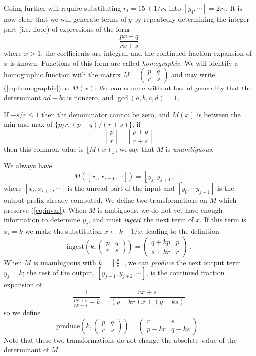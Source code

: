 \documentclass[11pt, oneside]{amsart}   	%
\newcommand{\pqrs}{\left(
\begin{smallmatrix} 
p & q\\ 
r & s 
\end{smallmatrix}
\right)}
\newcommand{\homographic}[4]{\begin{pmatrix} #1 & #2\\ #3 & #4 \end{pmatrix}}
\renewcommand{\:}{\negthickspace:\negthickspace}
\begin{document}
Going further will require substituting $r_1 = 15+1/r_2$ into $[y_4,\cdots] = 2r_1$.
It is now clear that we will generate terms of $y$ by repeatedly determining the integer part (i.e. floor) of expressions of the form
\begin{equation}\label{eq:homographic}
\frac{px+q}{rx+s}
\end{equation}
where $x > 1$, the coefficients are integral, and the continued fraction expansion of $x$ is known. Functions of this form are called \emph{homographic}.
We will identify a homographic function with the matrix
$M=\left(
\begin{smallmatrix} 
p & q\\ 
r & s 
\end{smallmatrix}
\right)$
and may write (\ref{eq:homographic}) as $M(x)$. We can assume without loss of generality that the determinant $ad-bc$ is nonzero, and $\gcd(a,b,c,d)=1$.

If $-s/r \leq 1$ then the denominator cannot be zero, and $M(x)$ is between the min and max of $\{p/r, (p+q)/(r+s)\}$; if
\[
\left\lfloor \frac{p}{r}\right\rfloor = \left\lfloor \frac{p+q}{r+s}\right\rfloor
\]
then this common value is $\lfloor M(x) \rfloor$; we say that $M$ is \emph{unambiguous}.


We always have
\begin{equation}\label{eq:invar}
M([x_i,x_{i+1},\cdots]) = [y_j,y_{j+1},\cdots]
\end{equation}
where $[x_i,x_{i+1},\cdots]$ is the unread part of the input and $[y_0,\cdots y_{j-1}]$ is the output prefix already computed. 
We define two transformations on $M$ which preserve (\ref{eq:invar}). When $M$ is ambiguous, we do not yet have enough information to determine $y_j$, and must $\emph{ingest}$ the next term of $x$. If this term is $x_i=k$ we make the substitution $x \leftarrow k + 1/x$, leading to the definition
\[
\mbox{ingest}(k,\pqrs) = \homographic{q+kp}{p}{s+kr}{r}\ .%
\]
When $M$ is unambiguous with $k=\left\lfloor \frac{p}{r}\right\rfloor$, we can \emph{produce}
the next output term $y_j = k$; the rest of the output, $[y_{j+1},y_{j+2},\cdots]$, is the continued fraction expansion of
\[
\frac{1}{\frac{px+q}{rx+s}-k} = \frac{rx+s}{(p-kr)x + (q-ks)}
\] 
so we define 
\[
\mbox{produce}(k,\pqrs) = \homographic{r}{s}{p-kr}{q-ks}\ .
\]
Note that these two transformations do not change the absolute value of the determinant of $M$.
\end{document}
